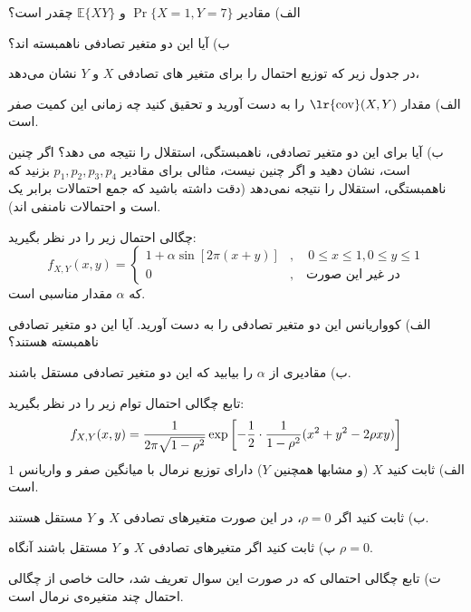 الف) مقادیر 
$
\Pr\{X=1,Y=7\}
$
و
$
\mathbb{E}\{XY\}
$
 چقدر است؟

ب) آیا این دو متغیر تصادفی ناهمبسته اند؟


\Q
در جدول زیر که توزیع احتمال را برای متغیر های تصادفی $X$ و $Y$ نشان می‌دهد،
\begin{table}[h]
\centering
\Large
{}
\end{table}

الف) مقدار 
$
\text{\lr{cov}}(X,Y)
$
 را به دست آورید و تحقیق کنید چه زمانی این کمیت صفر است.

ب) آیا برای این دو متغیر تصادفی، ناهمبستگی، استقلال را نتیجه می دهد؟ اگر چنین است، نشان دهید و اگر چنین نیست، مثالی برای مقادیر 
$
p_1,p_2,p_3,p_4
$
 بزنید که ناهمبستگی، استقلال را نتیجه نمی‌دهد (دقت داشته باشید که جمع احتمالات برابر یک است و احتمالات نامنفی اند).


\Q
چگالی احتمال زیر را در نظر بگیرید:
$$
f_{X,Y}(x,y)=\begin{cases}
1+\alpha\sin[2\pi(x+y)]&,\quad 0\le x\le1,0\le y\le1
\\0&,\quad \text{در غیر این صورت}
\end{cases}
$$
که $\alpha$ مقدار مناسبی است.

الف) کوواریانس این دو متغیر تصادفی را به دست آورید. آیا این دو متغیر تصادفی ناهمبسته هستند؟

ب) مقادیری از $\alpha$ را بیابید که این دو متغیر تصادفی مستقل باشند.


\Q
تابع چگالی احتمال توام زیر را در نظر بگیرید:
$$
f_{X,Y}(x,y)={1\over 2\pi \sqrt{1-\rho^2}}\exp\left[-{1\over 2}\cdot{1\over 1-\rho^2}(x^2+y^2-2\rho xy)\right]
$$
الف) ثابت کنید $X$ (و مشابها همچنین $Y$) دارای توزیع نرمال با میانگین صفر و واریانس $1$ است.

ب) ثابت کنید اگر $\rho=0$، در این صورت متغیرهای تصادفی $X$ و $Y$ مستقل هستند.

پ) ثابت کنید اگر متغیرهای تصادفی $X$ و $Y$ مستقل باشند آنگاه $\rho=0$.

ت) تابع چگالی احتمالی که در صورت این سوال تعریف شد، حالت خاصی از چگالی احتمال چند متغیره‌ی نرمال است.

